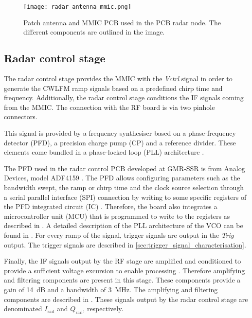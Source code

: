 \begin{figure}[ht]
	\centering
	\texttt{[image: radar\_antenna\_mmic.png]}
	\caption{Patch antenna and MMIC PCB used in the PCB radar node. The different components are outlined in the image. \label{fig:rf_board_general}}
\end{figure}

\subsection{Radar control stage} \label{sec:baseband_general}

The radar control stage provides the MMIC with the \textit{Vctrl} signal in order to generate the CWLFM ramp signals based on a predefined chirp time and frequency. Additionally, the radar control stage conditions the IF signals coming from the MMIC. The connection with the RF board is via two pinhole connectors.

This signal is provided by a frequency synthesiser based on a phase-frequency detector (PFD), a precision charge pump (CP) and a reference divider. These elements come bundled in a phase-locked loop (PLL) architecture \cite{Sardinero2022}.

The PFD used in the radar control PCB developed at GMR-SSR is from Analog Devices, model ADF4159 \cite{TexasInstrumentsADF}. The PFD allows configuring parameters such as the bandwidth swept, the ramp or chirp time and the clock source selection through a serial parallel interface (SPI) connection by writing to some specific registers of the PFD integrated circuit (IC) \cite{Sardinero2022, TexasInstrumentsADF}. Therefore, the board also integrates a microcontroller unit (MCU) that is programmed to write to the registers as described in \cite{Sardinero2022}. A detailed description of the PLL architecture of the VCO can be found in \cite[p.~92-94]{Sardinero2022}.
For every ramp of the signal, trigger signals are output in the \textit{Trig} output. The trigger signals are described in \cref{sec:trigger_signal_characterisation}.

Finally, the IF signals output by the RF stage are amplified and conditioned to provide a sufficient voltage excursion to enable processing \cite{Sardinero2022}. Therefore amplifying and filtering components are present in this stage. These components provide a gain of \SI{14}{dB} and a bandwidth of \SI{3}{\mega\hertz}. The amplifying and filtering components are described in \cite[p.~83-87]{Sardinero2022}.
These signals output by the radar control stage are denominated $I_\mathrm{rad}$ and $Q_\mathrm{rad}$, respectively.

